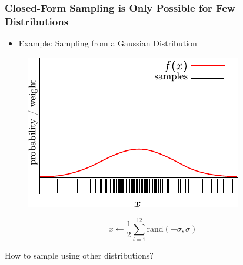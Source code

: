 \begin{frame}
    \frametitle{Closed-Form Sampling is Only Possible for Few Distributions}

    \begin{itemize}
        \item Example: Sampling from a Gaussian Distribution
    \end{itemize}

    \begin{figure}
        \begin{minipage}[m]{.5\textwidth}
            \raggedright
            \begin{center}
                \includegraphics[width=\columnwidth]{./images/particle_filter/gaussian_approximation_by_sampling.pdf}
            \end{center}
        \end{minipage}%
        \begin{minipage}[m]{.5\textwidth}
            \raggedleft
            \centering
            \begin{equation*}
                x \leftarrow \frac{1}{2} \sum_{i=1}^{12} \text{rand}(-\sigma, \sigma)    
            \end{equation*}
        \end{minipage}
    \end{figure}

    How to sample using other distributions?


\end{frame}

